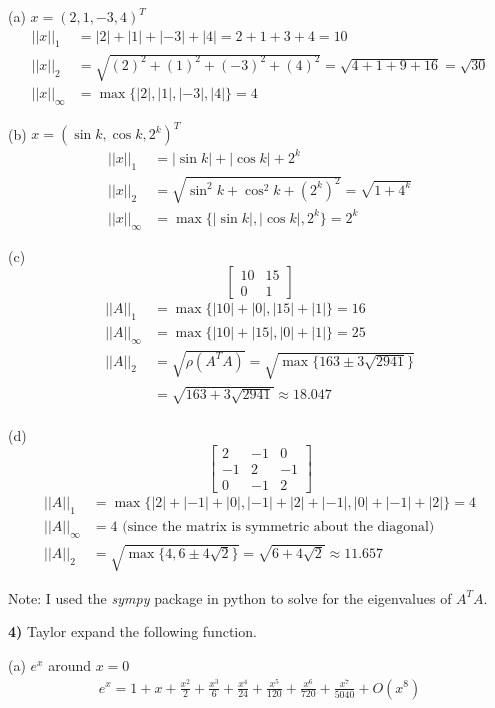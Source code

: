 \documentclass[12pt,a4paper]{article}
\newcommand{\prob}[2]{\textbf{#1)} #2}
\begin{document}
(a) $x = (2,1,-3,4)^{T}$
\begin{align*}
||x||_1 &= |2| + |1| + |-3| + |4| = 2 + 1 + 3 + 4 = 10 \\
||x||_2 &= \sqrt{(2)^2 + (1)^2 + (-3)^2 + (4)^2} = \sqrt{4 + 1 + 9 + 16} = \sqrt{30} \\
||x||_{\infty} &= \max\{|2|,|1|,|-3|,|4|\} = 4
\end{align*}

(b) $x = (\sin{k},\cos{k},2^{k})^{T}$
\begin{align*}
||x||_1 &= |\sin{k}| + |\cos{k}| + 2^{k} \\
||x||_2 &= \sqrt{\sin^{2}{k} + \cos^{2}{k} + (2^{k})^2} = \sqrt{1 + 4^{k}} \\
||x||_{\infty} &= \max\{|\sin{k}|,|\cos{k}|,2^k\} = 2^{k}
\end{align*}

(c) 
\[
\begin{bmatrix}
10 & 15 \\
0  & 1
\end{bmatrix}
\]
\begin{align*}
||A||_1 &= \max\{|10|+|0|,|15|+|1|\} = 16 \\
||A||_{\infty} &= \max\{|10|+|15|,|0|+|1|\} = 25 \\
||A||_{2} &= \sqrt{\rho(A^{T}A)} = \sqrt{\max\{163 \pm 3\sqrt{2941}\}} \\
&= \sqrt{163 + 3\sqrt{2941}} \approx 18.047
\end{align*}\\

(d) 
\[
\begin{bmatrix}
2 & -1 & 0 \\
-1 & 2 & -1 \\
0 & -1 & 2
\end{bmatrix}
\]
\begin{align*}
||A||_1 &= \max\{|2|+|-1|+|0|,|-1|+|2|+|-1|,|0|+|-1|+|2|\} = 4 \\
||A||_{\infty} &= 4 \text{ (since the matrix is symmetric about the diagonal)} \\
||A||_{2} &= \sqrt{\max\{4,6 \pm 4\sqrt{2}\}} = \sqrt{6 + 4\sqrt{2}} \approx{11.657}
\end{align*}

Note: I used the \textit{sympy} package in python to solve for the eigenvalues of $A^{T}A$.

\prob{4}{Taylor expand the following function.}

(a) $e^x$ around $x = 0$
\begin{align*}
e^{x} = 1 + x + \frac{x^{2}}{2} + \frac{x^{3}}{6} + \frac{x^{4}}{24} + \frac{x^{5}}{120} + \frac{x^{6}}{720} + \frac{x^{7}}{5040} + O\left(x^{8}\right)
\end{align*}
\end{document}
